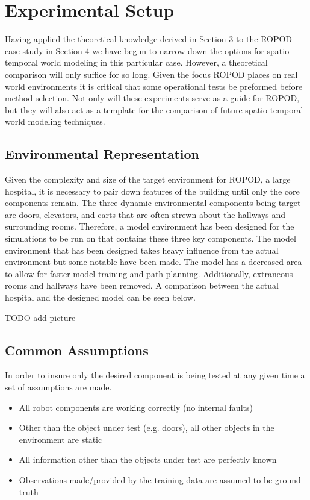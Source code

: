 
\chapter{Experimental Setup}

Having applied the theoretical knowledge derived in Section 3 to the ROPOD case
study in Section 4 we have begun to narrow down the options for spatio-temporal
world modeling in this particular case. However, a theoretical comparison will
only suffice for so long. Given the focus ROPOD places on real world
environments it is critical that some operational tests be preformed before
method selection. Not only will these experiments serve as a guide for ROPOD,
but they will also act as a template for the comparison of future
spatio-temporal world modeling techniques.


\section{ Environmental Representation}

Given the complexity and size of the target environment for ROPOD, a large
hospital, it is necessary to pair down features of the building until only the
core components remain. The three dynamic environmental components being
target are doors, elevators, and carts that are often strewn about the
hallways and surrounding rooms. Therefore, a model environment has been
designed for the simulations to be run on that contains these three key
components.  The model environment that has been designed takes heavy
influence from the actual environment but some notable have been made. The
model has a decreased area to allow for faster model training and path
planning. Additionally, extraneous rooms and hallways have been removed. A
comparison between the actual hospital and the designed model can be seen below.

TODO add picture


\section{ Common Assumptions }
In order to insure only the desired component is being tested at any given
time a set of assumptions are made.

\begin{itemize}

  \item All robot components are working correctly (no internal faults)

  \item Other than the object under test (e.g. doors), all other objects in the
        environment are static

  \item All information other than the objects under test are perfectly known

  \item Observations made/provided by the training data are assumed to be ground-truth

\end{itemize}



